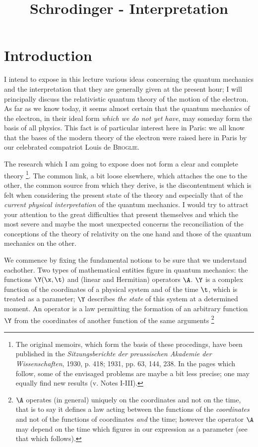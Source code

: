 \documentclass{article}
\title{Schrodinger - Interpretation}
\renewcommand{\it}[1]{\textit{#1}}
\renewcommand{\sc}[1]{\textsc{#1}}
\begin{document}
\section{Introduction}

I intend to expose in this lecture various ideas concerning the quantum mechanics and the interpretation that they are generally given at the present hour; I will principally discuss the relativistic quantum theory of the motion of the electron. As far as we know today, it seems almost certain that the quantum mechanics of the electron, in their ideal form \it{which we do not yet have}, may someday form the basis of all physics. This fact is of particular interest here in Paris: we all know that the bases of the modern theory of the electron were raised here in Paris by our celebrated compatriot Louis de \sc{Broglie}.

The research which I am going to expose does not form a clear and complete theory \footnote{The original memoirs, which form the basis of these procedings, have been published in the \it{Sitzungsberichte der preussischen Akademie der Wissenschaften}, 1930, p. 418; 1931, pp. 63, 144, 238. In the pages which follow, some of the envisaged problems are maybe a bit less precise; one may equally find new results (v. Notes I-III).}. The common link, a bit loose elsewhere, which attaches the one to the other, the common source from which they derive, is the discontentment which is felt when considering the present state of the theory and especially that of the \it{current physical interpretation} of the quantum mechanics. I would try to attract your attention to the great difficulties that present themselves and which the most severe and maybe the most unexpected concerns the reconciliation of the conceptions of the theory of relativity on the one hand and those of the quantum mechanics on the other.

We commence by fixing the fundamental notions to be sure that we understand eachother. Two types of mathematical entities figure in quantum mechanics: the functions $\Y(\x, \t)$ and (linear and Hermitian) operators $\A$. $\Y$ is a complex function of the coordinates of a physical system and of the time $\t$, which is treated as a parameter; $\Y$ describes \it{the state} of this system at a determined moment. An operator is a law permitting the formation of an arbitrary function $\Y$ from the coordinates of another function of the same arguments \footnote{$\A$ operates (in general) uniquely on the coordinates and not on the time, that is to say it defines a law acting between the functions of the \it{coordinates} and not of the functions of coordinates \it{and} the time; however the operator $\A$ may depend on the time which figures in our expression as a parameter (see that which follows).}
\end{document}
